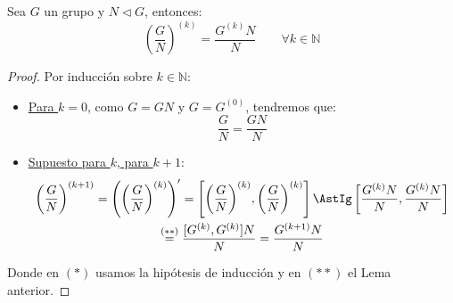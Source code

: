 \begin{lema}
    Sea $G$ un grupo y $N\lhd G$, entonces:
    \begin{equation*}
        {\left(\dfrac{G}{N}\right)}^{(k)} = \dfrac{G^{(k)}N}{N} \qquad \forall k\in \mathbb{N}
    \end{equation*}
    \begin{proof}
        Por inducción sobre $k\in \mathbb{N}$:
        \begin{itemize}
            \item \underline{Para $k=0$}, como $G=GN$ y $G=G^{(0)}$, tendremos que:
                \begin{equation*}
                    \dfrac{G}{N} = \dfrac{GN}{N}
                \end{equation*}
            \item \underline{Supuesto para $k$, para $k+1$}:
            \begin{multline*}
                {\left(\dfrac{G}{N}\right)}^{(k+1)} = \left({\left(\dfrac{G}{N}\right)}^{(k)}\right)' = \left[{\left(\dfrac{G}{N}\right)}^{(k)}, {\left(\dfrac{G}{N}\right)}^{(k)}\right] \AstIg \left[\dfrac{G^{(k)}N}{N}, \dfrac{G^{(k)}N}{N}\right] \\ \stackrel{(\ast\ast)}{=}  \dfrac{[G^{(k)}, G^{(k)}]N}{N} = \dfrac{G^{(k+1)}N}{N}
            \end{multline*}
        \end{itemize}
        Donde en $(\ast)$ usamos la hipótesis de inducción y en $(\ast\ast)$ el Lema anterior.
    \end{proof}
\end{lema}

